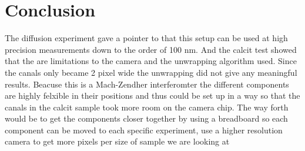 \section {Conclusion}
The diffusion experiment gave a pointer to that this setup can be used at high
precision measurements down to the order of 100 nm. And the calcit test showed
that the are limitations to the camera and the unwrapping algorithm used.
Since the canals only became 2 pixel wide the unwrapping did not give any meaningful
results. Beacuse this is a Mach-Zendher interferomter the different components
are highly felxible in their positions and thus could be set up in a way so that
the canals in the calcit sample took more room on the camera chip. The way forth 
would be to get the components closer together by using a breadboard so each component
can be moved to each specific experiment, use a higher resolution camera to get more
pixels per size of sample we are looking at
